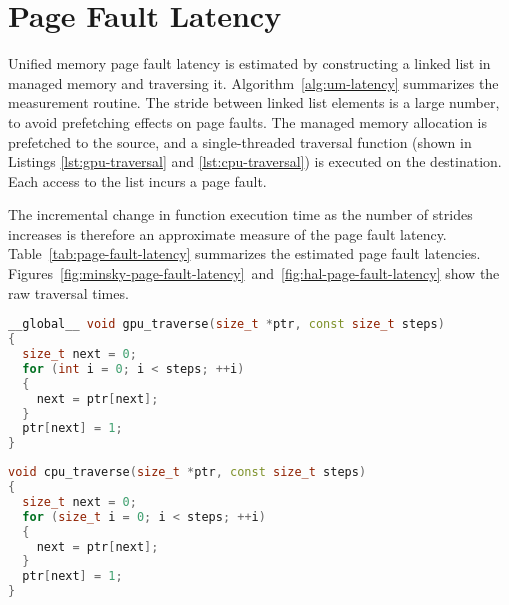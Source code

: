 \section{Page Fault Latency}

Unified memory page fault latency is estimated by constructing a linked list in managed memory and traversing it.
Algorithm~\ref{alg:um-latency} summarizes the measurement routine.
The stride between linked list elements is a large number, to avoid prefetching effects on page faults.
The managed memory allocation is prefetched to the source, and a single-threaded traversal function (shown in Listings \ref{lst:gpu-traversal} and \ref{lst:cpu-traversal}) is executed on the destination.
Each access to the list incurs a page fault.


The incremental change in function execution time as the number of strides increases is therefore an approximate measure of the page fault latency.
Table~\ref{tab:page-fault-latency} summarizes the estimated page fault latencies.
Figures~\ref{fig:minsky-page-fault-latency}~and~\ref{fig:hal-page-fault-latency} show the raw traversal times.

\begin{lstlisting}[language=c++, caption=GPU Linked List Traversal Kernel, label=lst:gpu-traversal]
__global__ void gpu_traverse(size_t *ptr, const size_t steps)
{
  size_t next = 0;
  for (int i = 0; i < steps; ++i)
  {
    next = ptr[next];
  }
  ptr[next] = 1;
}
\end{lstlisting}

\begin{lstlisting}[language=c++, caption=CPU Linked List Traversal Function, label=lst:cpu-traversal]
void cpu_traverse(size_t *ptr, const size_t steps)
{
  size_t next = 0;
  for (size_t i = 0; i < steps; ++i)
  {
    next = ptr[next];
  }
  ptr[next] = 1;
}
\end{lstlisting}

